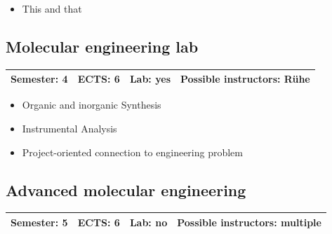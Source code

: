 \documentclass[12pt,twoside,fleqn,a4paper]{article}
\begin{document}
\begin{itemize}
\setlength\itemsep{0cm}
\item This and that
\end{itemize}


\subsection{Molecular engineering lab}
\begin{tabular}{llll} \hline
\textbf{Semester:} 4 & \textbf{ECTS:} 6 & \textbf{Lab:} yes & \textbf{Possible instructors:} Rühe\\
\hline
\end{tabular}

\begin{itemize}
\setlength\itemsep{0cm}
\item Organic and inorganic Synthesis
\item Instrumental Analysis
\item Project-oriented connection to engineering problem
\end{itemize}


\subsection{Advanced molecular engineering}
\begin{tabular}{llll} \hline
\textbf{Semester:} 5 & \textbf{ECTS:} 6 & \textbf{Lab:} no & \textbf{Possible instructors:} multiple\\
\hline
\end{tabular}
\end{document}
